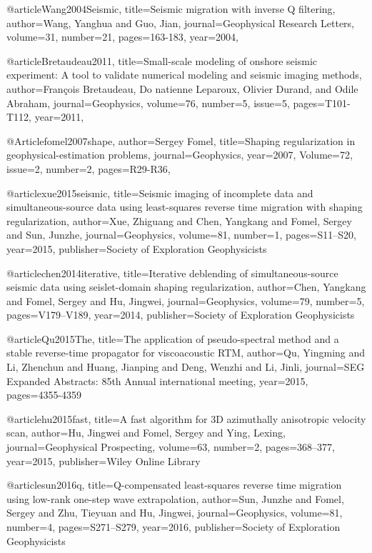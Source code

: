 {@article{Wang2004Seismic,
  title={Seismic migration with inverse {Q} filtering},
  author={Wang, Yanghua and Guo, Jian},
  journal={Geophysical Research Letters},
  volume={31},
  number={21},
  pages={163-183},
  year={2004},
}

@article{Bretaudeau2011,
  title={Small-scale modeling of onshore seismic experiment: A tool to validate numerical modeling and seismic imaging methods},
  author={François Bretaudeau, Do natienne Leparoux, Olivier Durand, and Odile Abraham},
  journal={Geophysics},
  volume={76},
  number={5},
  issue=5,
  pages={T101-T112},
  year={2011},
}

@Article{fomel2007shape,
  author={Sergey Fomel},
  title={Shaping regularization in geophysical-estimation problems},
  journal={Geophysics},
  year=2007,
  Volume=72,
  issue=2,
  number=2,
  pages={R29-R36},
}

@article{xue2015seismic,
  title={Seismic imaging of incomplete data and simultaneous-source data using least-squares reverse time migration with shaping regularization},
  author={Xue, Zhiguang and Chen, Yangkang and Fomel, Sergey and Sun, Junzhe},
  journal={Geophysics},
  volume={81},
  number={1},
  pages={S11--S20},
  year={2015},
  publisher={Society of Exploration Geophysicists}
}

@article{chen2014iterative,
  title={Iterative deblending of simultaneous-source seismic data using seislet-domain shaping regularization},
  author={Chen, Yangkang and Fomel, Sergey and Hu, Jingwei},
  journal={Geophysics},
  volume={79},
  number={5},
  pages={V179--V189},
  year={2014},
  publisher={Society of Exploration Geophysicists}
}

@article{Qu2015The,
  title={The application of pseudo-spectral method and a stable reverse-time propagator for viscoacoustic {RTM}},
  author={Qu, Yingming and Li, Zhenchun and Huang, Jianping and Deng, Wenzhi and Li, Jinli},
  journal={SEG Expanded Abstracts: 85th Annual international meeting},
  year={2015},
  pages={4355-4359}
}

@article{hu2015fast,
  title={A fast algorithm for 3{D} azimuthally anisotropic velocity scan},
  author={Hu, Jingwei and Fomel, Sergey and Ying, Lexing},
  journal={Geophysical Prospecting},
  volume={63},
  number={2},
  pages={368--377},
  year={2015},
  publisher={Wiley Online Library}
}

@article{sun2016q,
  title={Q-compensated least-squares reverse time migration using low-rank one-step wave extrapolation},
  author={Sun, Junzhe and Fomel, Sergey and Zhu, Tieyuan and Hu, Jingwei},
  journal={Geophysics},
  volume={81},
  number={4},
  pages={S271--S279},
  year={2016},
  publisher={Society of Exploration Geophysicists}
}

}
